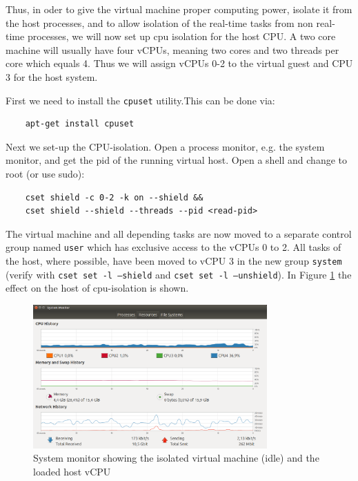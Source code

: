 \documentclass[]{scrartcl}
\begin{document}
Thus, in oder to give the virtual machine proper computing power, isolate it from the host processes, and to allow isolation of the real-time tasks from non real-time processes, we will now set up cpu isolation for the host CPU. A two core machine will usually have four vCPUs, meaning two cores and two threads per core which equals 4. Thus we will assign vCPUs 0-2 to the virtual guest and CPU 3 for the host system.

First we need to install the \texttt{cpuset} utility.This can be done via:

\begin{verbatim}
	apt-get install cpuset
\end{verbatim}

Next we set-up the CPU-isolation. Open a process monitor, e.g. the system monitor, and get the pid of the running virtual host. Open a shell and change to root (or use sudo):

\begin{verbatim}
	cset shield -c 0-2 -k on --shield &&
	cset shield --shield --threads --pid <read-pid>
\end{verbatim}

The virtual machine and all depending tasks are now moved to a separate control group named \texttt{user} which has exclusive access to the vCPUs 0 to 2. All tasks of the host, where possible, have been moved to vCPU 3 in the new group \texttt{system} (verify with \texttt{cset set -l --shield} and \texttt{cset set -l --unshield}). In Figure \ref{fig:test-cpu} the effect on the host of cpu-isolation is shown.

\begin{figure}[t]
	\centering
	\includegraphics[width=0.8\textwidth]{test-cpu}
	\caption{System monitor showing the isolated virtual machine (idle) and the loaded host vCPU}
	\label{fig:test-cpu}
\end{figure}
\end{document}
